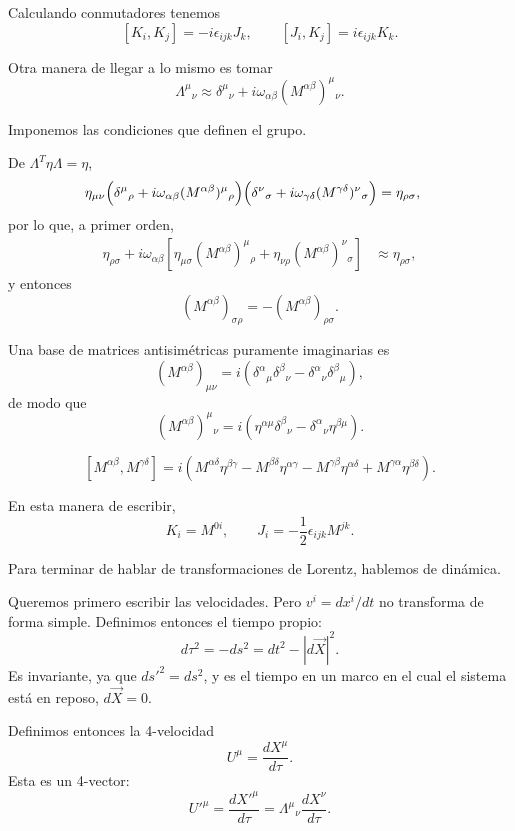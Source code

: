 \documentclass[11pt,a4paper]{article}
\newcommand{\concept}[1]{\textcolor{concept-green}{#1}}
\begin{document}
Calculando conmutadores tenemos
\[
  [K_i,K_j]=-i\epsilon_{ijk}J_k,
  \qquad
  [J_i,K_j]=i\epsilon_{ijk}K_k.
\]

Otra manera de llegar a lo mismo es tomar
\[
  \Lambda^\mu{}_{\nu}
  \approx\delta^\mu{}_{\nu}
  +i\omega_{\alpha\beta}(M^{\alpha\beta})^\mu{}_{\nu}.
\]

Imponemos las condiciones que definen el grupo.

De $\Lambda^T\eta\Lambda=\eta$,
\begin{align*}
  \eta_{\mu\nu}
  \Bigl(\delta^\mu{}_{\rho}
    +i\omega_{\alpha\beta}(M^{\alpha\beta})^\mu{}_{\rho}\Bigr)
  \Bigl(\delta^\nu{}_{\sigma}
    +i\omega_{\gamma\delta}(M^{\gamma\delta})^\nu{}_{\sigma}\Bigr)
  &=\eta_{\rho\sigma},
\end{align*}
por lo que, a primer orden,
\begin{align*}
  \eta_{\rho\sigma}
  +i\omega_{\alpha\beta}
  \left[
    \eta_{\mu\sigma}(M^{\alpha\beta})^\mu{}_{\rho}
    +\eta_{\nu\rho}(M^{\alpha\beta})^\nu{}_{\sigma}
  \right]
  &\approx\eta_{\rho\sigma},
\end{align*}
y entonces
\[
  (M^{\alpha\beta})_{\sigma\rho}
  =-(M^{\alpha\beta})_{\rho\sigma}.
\]

Una base de matrices antisimétricas puramente imaginarias es
\[
  (M^{\alpha\beta})_{\mu\nu}
  =i\left(\delta^\alpha{}_{\mu}\delta^\beta{}_{\nu}
          -\delta^\alpha{}_{\nu}\delta^\beta{}_{\mu}\right),
\]
de modo que
\[
  (M^{\alpha\beta})^\mu{}_{\nu}
  =i\left(\eta^{\alpha\mu}\delta^\beta{}_{\nu}
          -\delta^\alpha{}_{\nu}\eta^{\beta\mu}\right).
\]

\[
  [M^{\alpha\beta},M^{\gamma\delta}]
  =i\left(
    M^{\alpha\delta}\eta^{\beta\gamma}
    -M^{\beta\delta}\eta^{\alpha\gamma}
    -M^{\gamma\beta}\eta^{\alpha\delta}
    +M^{\gamma\alpha}\eta^{\beta\delta}
  \right).
\]

En esta manera de escribir,
\[
  K_i=M^{0i},
  \qquad
  J_i=-\frac12\epsilon_{ijk}M^{jk}.
\]

Para terminar de hablar de transformaciones de Lorentz, hablemos de dinámica.

Queremos primero escribir las velocidades. Pero $v^i=dx^i/dt$ no transforma de forma simple. Definimos entonces el \concept{tiempo propio}:
\[
  d\tau^2=-ds^2=dt^2-|d\vec X|^2.
\]
Es invariante, ya que $ds'^2=ds^2$, y es el tiempo en un marco en el cual el sistema está en reposo, $d\vec X=0$.

Definimos entonces la \concept{4-velocidad}
\[
  U^\mu=\frac{dX^\mu}{d\tau}.
\]
Esta es un 4-vector:
\[
  U'^\mu=\frac{dX'^\mu}{d\tau}
  =\Lambda^\mu{}_{\nu}\frac{dX^\nu}{d\tau}.
\]
\end{document}
